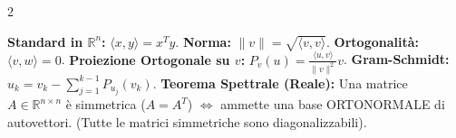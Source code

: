 \begin{multicols*}{2}
\begin{tcolorbox}[colback=white, colframe=maroon, title={Prodotti Scalari e Spettale}]
\small
\textbf{Standard in $\mathbb{R}^n$:} $\langle x, y \rangle = x^T y$.
\textbf{Norma:} $\|v\| = \sqrt{\langle v, v \rangle}$.
\textbf{Ortogonalità:} $\langle v, w \rangle = 0$.
\textbf{Proiezione Ortogonale su $v$:} $P_v(u) = \frac{\langle u, v \rangle}{\|v\|^2} v$.
\textbf{Gram-Schmidt:} $u_{k} = v_k - \sum_{j=1}^{k-1} P_{u_j}(v_k)$.
\tcblower
\textbf{Teorema Spettrale (Reale):}
Una matrice $A \in \mathbb{R}^{n \times n}$ è simmetrica ($A=A^T$) $\iff$ ammette una base ORTONORMALE di autovettori.
(Tutte le matrici simmetriche sono diagonalizzabili).
\end{tcolorbox}

\end{multicols*}
\restoregeometry
